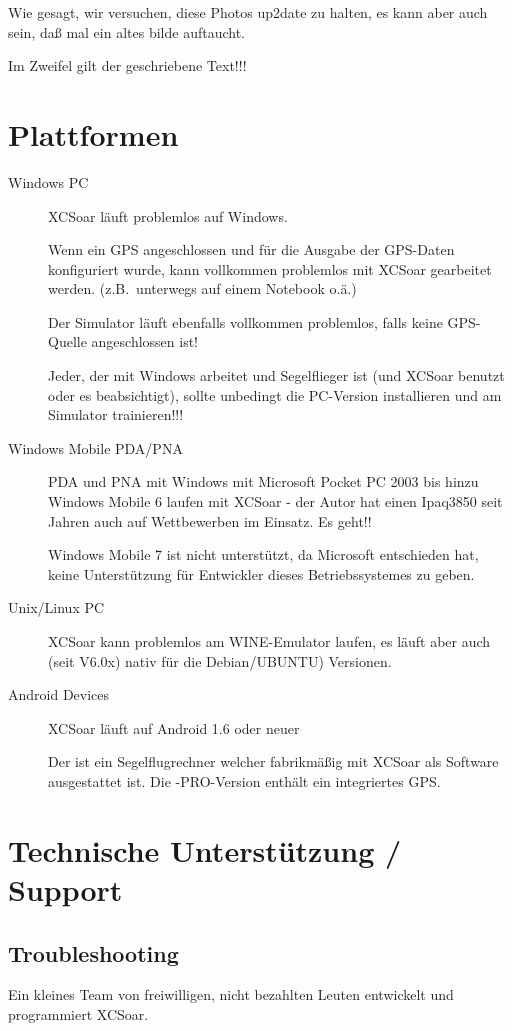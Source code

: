Wie gesagt, wir versuchen, diese Photos up2date zu halten, es kann aber auch sein, daß mal ein altes bilde auftaucht.

Im Zweifel gilt der geschriebene Text!!!

\section{Plattformen}
\begin{description}
\item[Windows PC]
\textsf{XCSoar} läuft problemlos auf Windows.

Wenn ein GPS angeschlossen und für die Ausgabe der GPS-Daten konfiguriert wurde, kann vollkommen problemlos mit \textsf{XCSoar} gearbeitet 
werden.  (z.B.\ unterwegs auf einem Notebook o.ä.)

Der Simulator läuft ebenfalls vollkommen problemlos, falls keine GPS-Quelle angeschlossen ist!

Jeder, der mit Windows arbeitet und Segelflieger ist (und \textsf{XCSoar} benutzt oder es beabsichtigt), sollte unbedingt die 
PC-Version installieren und am Simulator trainieren!!! 
\item[Windows Mobile PDA/PNA]
PDA und PNA mit Windows mit Microsoft Pocket PC 2003 bis hinzu Windows Mobile 6 laufen mit \textsf{XCSoar} - der Autor hat einen Ipaq3850 seit Jahren 
auch auf Wettbewerben im Einsatz. Es geht!!

Windows Mobile 7 ist nicht unterstützt, da Microsoft entschieden hat, keine Unterstützung für Entwickler dieses 
Betriebssystemes zu geben.
\item[Unix/Linux PC]
\textsf{XCSoar} kann problemlos am WINE-Emulator laufen, es läuft aber auch (seit V6.0x) nativ für die Debian/UBUNTU) Versionen.
\item[Android Devices] \textsf{XCSoar} läuft auf Android 1.6 oder neuer 
\item[\al] Der \al ist ein Segelflugrechner welcher fabrikmäßig mit \textsf{XCSoar} als Software ausgestattet ist. 
Die \al-PRO-Version enthält ein integriertes GPS.
\end{description}


\section{Technische Unterstützung / Support}

\subsection*{Troubleshooting}
Ein kleines Team von freiwilligen, nicht bezahlten Leuten entwickelt und programmiert \textsf{XCSoar}. 

